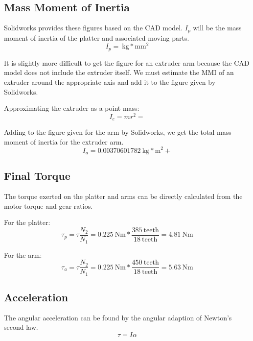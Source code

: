 \documentclass[12pt,letterpaper]{report}
\begin{document}
\subsection*{Mass Moment of Inertia}
Solidworks provides these figures based on the CAD model. $I_p$ will be the mass moment of inertia of the platter and associated moving parts.
\begin{equation}
	I_p = ~\mathrm{kg*mm^2}
\end{equation}

It is slightly more difficult to get the figure for an extruder arm because the CAD model does not include the extruder itself. We must estimate the MMI of an extruder around the appropriate axis and add it to the figure given by Solidworks.

Approximating the extruder as a point mass:
\begin{equation}
	I_e = mr^2 = 
\end{equation}

Adding to the figure given for the arm by Solidworks, we get the total mass moment of inertia for the extruder arm.
\begin{equation}
	I_a = 0.00370601782~\mathrm{kg*m^2} +
\end{equation}

\subsection*{Final Torque}
The torque exerted on the platter and arms can be directly calculated from the motor torque and gear ratios.

For the platter:
\begin{equation}
	\tau_p = \tau \dfrac{N_2}{N_1} = 0.225~\mathrm{Nm} * \dfrac{385~\mathrm{teeth}}{18~\mathrm{teeth}} = 4.81~\mathrm{Nm}
\end{equation}

For the arm:
\begin{equation}
	\tau_a = \tau \dfrac{N_2}{N_1} = 0.225~\mathrm{Nm} * \dfrac{450~\mathrm{teeth}}{18~\mathrm{teeth}} = 5.63~\mathrm{Nm}
\end{equation}

\subsection*{Acceleration}
The angular acceleration can be found by the angular adaption of Newton's second law.
\begin{equation}
	\tau = I\alpha
\end{equation}
\end{document}
